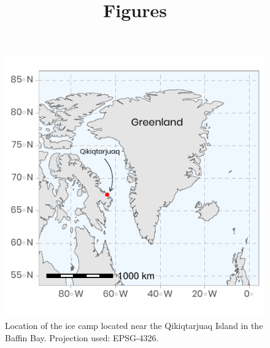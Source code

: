 \documentclass[12pt,a4paper]{scrartcl}
\title{Figures}
\date{}
\begin{document}
\maketitle

\begin{figure}[h]
	\centering
	\includegraphics[scale = 1]{../../../graphs/fig01.pdf}
	\caption{Location of the ice camp located near the Qikiqtarjuaq Island in the Baffin Bay. Projection used: EPSG-4326.}
\end{figure}

\clearpage
\newpage
\end{document}
